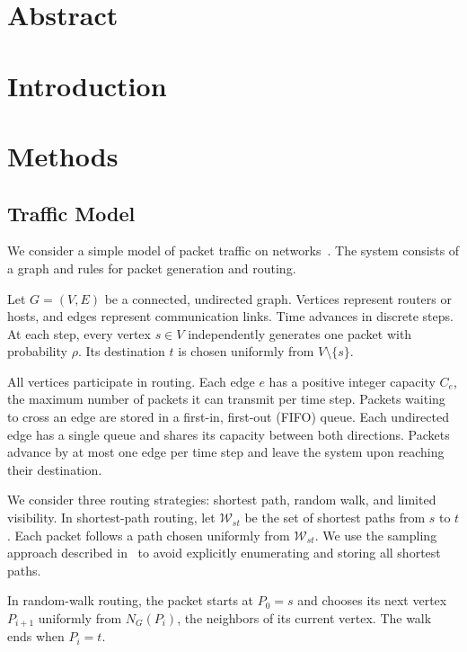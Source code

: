 \documentclass[a4paper]{article}
\begin{document}
\section{Abstract}


\section{Introduction}

\section{Methods}

\subsection{Traffic Model}
\label{sec:traffic_model}

We consider a simple model of packet traffic on
networks~\cite{chenTrafficDynamicsComplex2012}. The system consists
of a graph and rules for packet generation and routing.

Let $G=(V,E)$ be a connected, undirected graph. Vertices represent
routers or hosts, and edges represent communication links. Time
advances in discrete steps. At each step, every vertex
$s \in V$ independently generates one
packet with probability $\rho$. Its destination $t$ is chosen uniformly
from $V \setminus \{s\}$.

All vertices participate in routing. Each edge $e$ has a positive
integer capacity $C_e$, the maximum number of packets it can transmit
per time step. Packets waiting to cross an edge are stored in a
first-in, first-out (FIFO) queue. Each undirected edge has a single
queue and shares its capacity between both directions. Packets advance
by at most one edge per time step and leave the system upon reaching
their destination.

We consider three routing strategies: shortest path, random walk, and
limited visibility. In shortest-path routing, let $\mathcal{W}_{st}$
be the set of shortest paths from $s$ to $t$. Each packet follows a
path chosen uniformly from $\mathcal{W}_{st}$. We use the sampling
approach described in~\cite{dreyerOptimalUniformShortest2025}
to avoid explicitly enumerating and storing all shortest paths.

In random-walk routing, the packet starts at $P_0=s$ and chooses
its next vertex $P_{i+1}$ uniformly from $N_G(P_i)$, the neighbors
of its current vertex. The walk ends when $P_i=t$.
\end{document}

